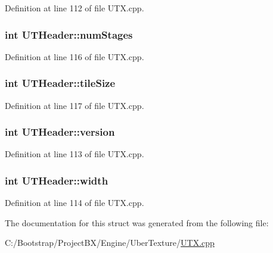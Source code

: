 Definition at line 112 of file UTX.cpp.\hypertarget{struct_u_t_header_59ad5aaff6083f0136dbe7d1875603d2}{
\subsubsection[{numStages}]{\setlength{\rightskip}{0pt plus 5cm}int {\bf UTHeader::numStages}}}
\label{struct_u_t_header_59ad5aaff6083f0136dbe7d1875603d2}




Definition at line 116 of file UTX.cpp.\hypertarget{struct_u_t_header_83e57b185d9c010ed927a4d07c570b33}{
\subsubsection[{tileSize}]{\setlength{\rightskip}{0pt plus 5cm}int {\bf UTHeader::tileSize}}}
\label{struct_u_t_header_83e57b185d9c010ed927a4d07c570b33}




Definition at line 117 of file UTX.cpp.\hypertarget{struct_u_t_header_8e3185b7f9941a663f06a879c8d0a0fa}{
\subsubsection[{version}]{\setlength{\rightskip}{0pt plus 5cm}int {\bf UTHeader::version}}}
\label{struct_u_t_header_8e3185b7f9941a663f06a879c8d0a0fa}




Definition at line 113 of file UTX.cpp.\hypertarget{struct_u_t_header_40fc887172fff3070cc65b89284fd6a2}{
\subsubsection[{width}]{\setlength{\rightskip}{0pt plus 5cm}int {\bf UTHeader::width}}}
\label{struct_u_t_header_40fc887172fff3070cc65b89284fd6a2}




Definition at line 114 of file UTX.cpp.

The documentation for this struct was generated from the following file:\begin{CompactItemize}
\item 
C:/Bootstrap/ProjectBX/Engine/UberTexture/\hyperlink{_u_t_x_8cpp}{UTX.cpp}\end{CompactItemize}
